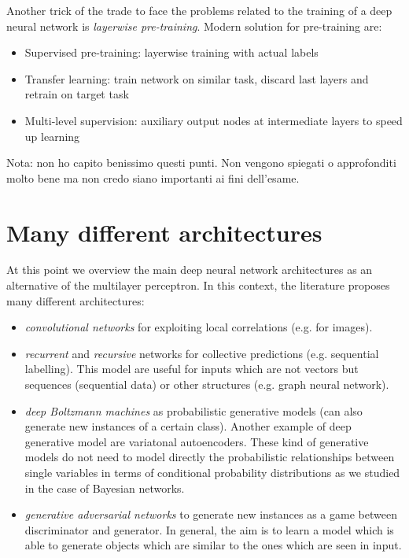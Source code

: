 Another trick of the trade to face the problems related to the training of a deep neural network is \textit{layerwise pre-training}. Modern solution for pre-training are:
\begin{itemize}
    \item Supervised pre-training: layerwise training with actual labels
    
    \item Transfer learning: train network on similar task, discard last layers and retrain on target task
    
    \item Multi-level supervision: auxiliary output nodes at intermediate layers to speed up learning
\end{itemize}
Nota: non ho capito benissimo questi punti. Non vengono spiegati o approfonditi molto bene ma non credo siano importanti ai fini dell'esame.

\section{Many different architectures}
At this point we overview the main deep neural network architectures as an alternative of the multilayer perceptron. In this context, the literature proposes many different architectures:

\begin{itemize}
    \item \textit{convolutional networks} for exploiting local correlations (e.g. for images).
    
    \item \textit{recurrent} and \textit{recursive} networks for collective predictions (e.g. sequential labelling). This model are useful for inputs which are not vectors but sequences (sequential data) or other structures (e.g. graph neural network).
    
    \item \textit{deep Boltzmann machines} as probabilistic generative models (can also generate new instances of a certain class). Another example of deep generative model are variatonal autoencoders. These kind of generative models do not need to model directly the probabilistic relationships between single variables in terms of conditional probability distributions as we studied in the case of Bayesian networks.
    
    \item \textit{generative adversarial networks} to generate new instances as a game between discriminator and generator. In general, the aim is to learn a model which is able to generate objects which are similar to the ones which are seen in input.
\end{itemize}


